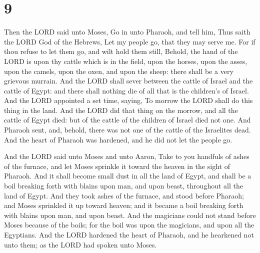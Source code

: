 \hypertarget{section-8}{%
\section{9}\label{section-8}}

 Then the LORD said unto Moses, Go in unto Pharaoh, and tell
him, Thus saith the LORD God of the Hebrews, Let my people go, that they
may serve me.  For if thou refuse to let them go, and wilt
hold them still,  Behold, the hand of the LORD is upon thy
cattle which is in the field, upon the horses, upon the asses, upon the
camels, upon the oxen, and upon the sheep: there shall be a very
grievous murrain.  And the LORD shall sever between the
cattle of Israel and the cattle of Egypt: and there shall nothing die of
all that is the children's of Israel.  And the LORD
appointed a set time, saying, To morrow the LORD shall do this thing in
the land.  And the LORD did that thing on the morrow, and
all the cattle of Egypt died: but of the cattle of the children of
Israel died not one.  And Pharaoh sent, and, behold, there
was not one of the cattle of the Israelites dead. And the heart of
Pharaoh was hardened, and he did not let the people go.

 And the LORD said unto Moses and unto Aaron, Take to you
handfuls of ashes of the furnace, and let Moses sprinkle it toward the
heaven in the sight of Pharaoh.  And it shall become small
dust in all the land of Egypt, and shall be a boil breaking forth with
blains upon man, and upon beast, throughout all the land of Egypt.
 And they took ashes of the furnace, and stood before
Pharaoh; and Moses sprinkled it up toward heaven; and it became a boil
breaking forth with blains upon man, and upon beast.  And
the magicians could not stand before Moses because of the boils; for the
boil was upon the magicians, and upon all the Egyptians. 
And the LORD hardened the heart of Pharaoh, and he hearkened not unto
them; as the LORD had spoken unto Moses.

